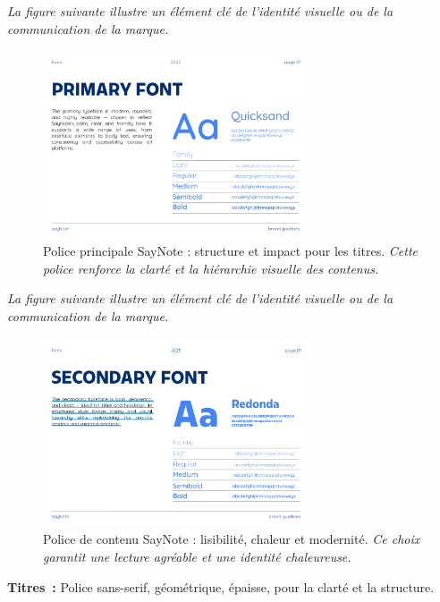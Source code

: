 \noindent
\textit{La figure suivante illustre un élément clé de l'identité visuelle ou de la communication de la marque.}
\begin{figure}[H]
    \centering
    \includegraphics[width=0.7\textwidth]{docs/visual-indentity/pictures/primary-font.png}
    \caption{Police principale SayNote : structure et impact pour les titres. \newline\textit{Cette police renforce la clarté et la hiérarchie visuelle des contenus.}}
\end{figure}
\noindent
\textit{La figure suivante illustre un élément clé de l'identité visuelle ou de la communication de la marque.}
\begin{figure}[H]
    \centering
    \includegraphics[width=0.7\textwidth]{docs/visual-indentity/pictures/secondery-font.png}
    \caption{Police de contenu SayNote : lisibilité, chaleur et modernité. \newline\textit{Ce choix garantit une lecture agréable et une identité chaleureuse.}}
\end{figure}

\textbf{Titres~:}
Police sans-serif, géométrique, épaisse, pour la clarté et la structure.

